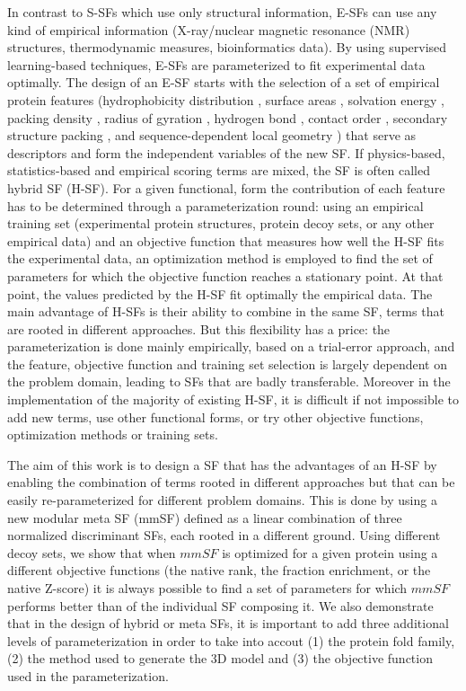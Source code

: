 \documentclass[a4paper,20pt,notitlepage,openbib]{article}
\begin{document}
In contrast to S-SFs which use only structural information, E-SFs can use any kind of empirical information (X-ray/nuclear magnetic resonance (NMR) structures, thermodynamic measures, bioinformatics data). By using supervised learning-based techniques, E-SFs are parameterized to fit experimental data optimally. 
The design of an E-SF starts with the selection of a set of empirical protein features (hydrophobicity distribution \cite{silverman:hydro02, silverman:hydro01, Fang:paper01}, surface areas \cite{berglund:paper01, Fang:paper01}, solvation energy \cite{Liang:paper01}, packing density \cite{berglund:paper01,jernigan:Miyazawa}, radius of gyration \cite{simons:paper01}, hydrogen bond \cite{Fujitsuka:Wolynes}, contact order \cite{berglund:paper01}, secondary structure packing \cite{simons:paper01}, and sequence-dependent local geometry \cite{Zhang:CLGP}) that serve as descriptors and form the independent variables of the new SF. If physics-based, statistics-based and empirical scoring terms are mixed, the SF is often called hybrid SF (H-SF). For a given functional, form the contribution of each feature has to be determined through a parameterization round: using an empirical training set (experimental protein structures, protein decoy sets, or any other empirical data) and an objective function that measures how well the H-SF fits the experimental data, an optimization method is employed to find the set of parameters for which the objective function reaches a stationary point. At that point, the values predicted by the H-SF fit optimally the empirical data. The main advantage of H-SFs is their ability to combine in the same SF, terms that are rooted in different approaches. But this flexibility has a price: the parameterization is done mainly empirically, based on a trial-error approach, and the feature, objective function and training set selection is largely dependent on the problem domain, leading to SFs that are badly transferable. Moreover in the implementation of the majority of existing H-SF, it is difficult if not impossible to add new terms, use other functional forms, or try other objective functions, optimization methods or training sets.

The aim of this work is to design a SF that has the advantages of an H-SF by enabling the combination of terms rooted in different approaches but that can be easily re-parameterized for different problem domains.  This is done by using a new modular meta SF (mmSF) defined as a linear combination of three normalized discriminant SFs, each rooted in a different ground. Using different decoy sets, we show that when $mmSF$ is optimized for a given protein using a different objective functions (the native rank, the fraction enrichment, or the native Z-score) it is always possible to find a set of parameters for which $mmSF$ performs better than of the individual SF composing it. We also demonstrate that in the design of hybrid or meta SFs, it is important to add three additional levels of parameterization in order to take into accout (1) the protein fold family, (2) the method used to generate the 3D model and (3) the objective function used in the parameterization.
\end{document}
